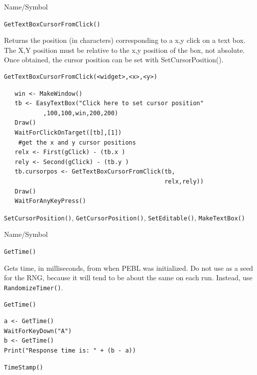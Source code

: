 \begin{desc}{Name/Symbol}
\item[Name/Symbol]	\verb+GetTextBoxCursorFromClick()+

\item[Description]	Returns the position (in characters) corresponding to a x,y click on a text box.  The X,Y position must be relative to the x,y position of the box, not absolute.  Once obtained, the cursor position can be set with SetCursorPosition().

\item[Usage]
\begin{verbatim}
GetTextBoxCursorFromClick(<widget>,<x>,<y>)
\end{verbatim}

\item[Example]	
\small
\begin{verbatim}
   win <- MakeWindow()
   tb <- EasyTextBox("Click here to set cursor position"
           ,100,100,win,200,200)
   Draw()
   WaitForClickOnTarget([tb],[1])
    #get the x and y cursor positions
   relx <- First(gClick) - (tb.x )
   rely <- Second(gClick) - (tb.y )
   tb.cursorpos <- GetTextBoxCursorFromClick(tb,
                                             relx,rely))
   Draw()
   WaitForAnyKeyPress()
\end{verbatim}
\normalsize
\item[See Also]	\verb+SetCursorPosition()+, \verb+GetCursorPosition()+, \verb+SetEditable()+, \verb+MakeTextBox()+
\end{desc}



\begin{desc}{Name/Symbol}
\item[Name/Symbol]	\verb+GetTime()+

\item[Description] Gets time, in milliseconds, from when PEBL was
  initialized.  Do not use as a seed for the RNG, because it will tend
  to be about the same on each run. Instead, use \verb+RandomizeTimer()+.

\item[Usage]
\begin{verbatim}
GetTime()
\end{verbatim}

\item[Example]
\begin{verbatim}
a <- GetTime()
WaitForKeyDown("A")
b <- GetTime()
Print("Response time is: " + (b - a))
\end{verbatim}

\item[See Also]	\verb+TimeStamp()+
\end{desc}


